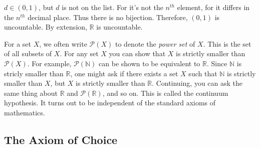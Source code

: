 \documentclass[crop=false,class=book,oneside]{standalone}
\begin{document}
            $d\in(0,1)$, but $d$ is not on the list. For it's not
            the $n^{th}$ element, for it differs in the
            $n^{th}$ decimal place. Thus there is no bijection.
            Therefore, $(0,1)$ is uncountable. By extension,
            $\mathbb{R}$ is uncountable.
            \par\hfill\par
            \vspace{-2ex}
            For a set $X$, we often write
            $\mathcal{P}(X)$ to denote the
            \textit{power set} of $X$. This is the
            set of all subsets of $X$.
            For any set $X$ you can show that $X$ is
            strictly smaller than $\mathcal{P}(X)$.
            For example, $\mathcal{P}(\mathbb{N})$
            can be shown to be equivalent to $\mathbb{R}$.
            Since $\mathbb{N}$ is stricly smaller than
            $\mathbb{R}$, one might ask if there exists
            a set $X$ such that $\mathbb{N}$ is strictly
            smaller than $X$, but $X$ is strictly smaller
            than $\mathbb{R}$. Continuing, you can ask the
            same thing about $\mathbb{R}$ and
            $\mathcal{P}(\mathbb{R})$, and so on.
            This is called the continuum hypothesis.
            It turns out to be independent of
            the standard axioms of mathematics.
        \subsection{The Axiom of Choice}
\end{document}
